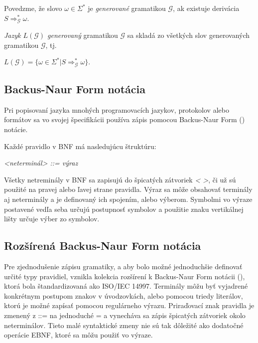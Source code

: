 \begin{definice}
Povedzme, že slovo $\omega \in \Sigma^*$ je \textit{generované} gramatikou $\mathcal{G}$, ak existuje derivácia $S\Rightarrow_\mathcal{G}^*\omega$.

\textit{Jazyk $L(\mathcal{G})$ generovaný} gramatikou $\mathcal{G}$ sa skladá zo všetkých slov generovaných gramatikou $\mathcal{G}$, tj.
\begin{center}
$L(\mathcal{G}) = \{\omega \in \Sigma^* | S \Rightarrow_\mathcal{G}^* \omega\}$.\cite{demlova:gramatiky}
\end{center}
\end{definice}

\subsection{Backus-Naur Form notácia}\label{BNF}
Pri popisovaní jazyka mnohých programovacích jazykov, protokolov alebo formátov sa vo svojej špecifikácii používa zápis pomocou Backus-Naur Form () notácie.\cite{might:languages} 

Každé pravidlo v BNF má nasledujúcu štruktúru:
\begin{center}
\textit{<neterminál> ::= výraz}
\end{center}

Všetky netreminály v BNF sa zapisujú do špicatých zátvoriek \textit{< >}, či už sú použité na pravej alebo ľavej strane pravidla. Výraz sa môže obsahovať terminály aj neterminály a je definovaný ich spojením, alebo výberom. Symbolmi vo výraze postavené vedľa seba určujú postupnosť symbolov a použitie znaku vertikálnej lišty určuje výber zo symbolov.

\subsection{Rozšírená Backus-Naur Form notácia}\label{EBNF}
Pre zjednodušenie zápisu gramatiky, a aby bolo možné jednoduchšie definovať určité typy pravidiel, vznikla kolekcia rozšírení k Backus-Naur Form notácii (), ktorá bola štandardizovaná ako ISO/IEC 14997\cite{ISO14977}. Terminály môžu byť vyjadrené konkrétnym postupom znakov v úvodzovkách, alebo pomocou triedy literálov, ktorú je možné zapísať pomocou regulárneho výrazu. Priraďovací znak pravidla je zmenený z ::= na jednoduché = a vynecháva sa zápis špicatých zátvoriek okolo neterminálov. Tieto malé syntaktické zmeny nie sú tak dôležité ako dodatočné operácie EBNF, ktoré sa môžu použiť vo výraze.

